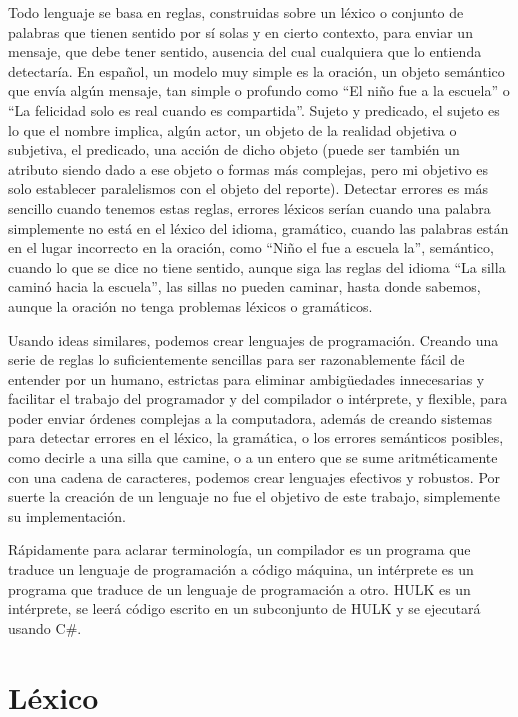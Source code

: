 \documentclass{article}
\begin{document}
Todo lenguaje se basa en reglas, construidas sobre un léxico o conjunto de palabras que tienen sentido por sí solas y en cierto contexto, para enviar un mensaje, que debe tener sentido, ausencia del cual cualquiera que lo entienda detectaría. En ­español, un modelo muy simple es la oración, un objeto semántico que envía algún mensaje, tan simple o profundo como “El niño fue a la escuela” o “La felicidad solo es real cuando es compartida”. Sujeto y predicado, el sujeto es lo que el nombre implica, algún actor, un objeto de la realidad objetiva o subjetiva, el predicado, una acción de dicho objeto (puede ser también un atributo siendo dado a ese objeto o formas más complejas, pero mi objetivo es solo establecer paralelismos con el objeto del reporte). Detectar errores es más sencillo cuando tenemos estas reglas, errores léxicos serían cuando una palabra simplemente no está en el léxico del idioma, gramático, cuando las palabras están en el lugar incorrecto en la oración, como “Niño el fue a escuela la”, semántico, cuando lo que se dice no tiene sentido, aunque siga las reglas del idioma “La silla caminó hacia la escuela”, las sillas no pueden caminar, hasta donde sabemos, aunque la oración no tenga problemas léxicos o gramáticos.

Usando ideas similares, podemos crear lenguajes de programación. Creando una serie de reglas lo suficientemente sencillas para ser razonablemente fácil de entender por un humano, estrictas para eliminar ambigüedades innecesarias y facilitar el trabajo del programador y del compilador o intérprete, y flexible, para poder enviar órdenes complejas a la computadora, además de creando sistemas para detectar errores en el léxico, la gramática, o los errores semánticos posibles, como decirle a una silla que camine, o a un entero que se sume aritméticamente con una cadena de caracteres, podemos crear lenguajes efectivos y robustos. Por suerte la creación de un lenguaje no fue el objetivo de este trabajo, simplemente su implementación.

Rápidamente para aclarar terminología, un compilador es un programa que traduce un lenguaje de programación a código máquina, un intérprete es un programa que traduce de un lenguaje de programación a otro. HULK es un intérprete, se leerá código escrito en un subconjunto de HULK y se ejecutará usando C\#.

\newpage

\section{Léxico}
\end{document}

